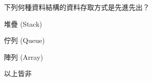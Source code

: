 \ifx\ntpcNinetyThree\undefined[93學年基北區] \fi
下列何種資料結構的資料存取方式是先進先出？
  \begin{optionlist}
  \item 堆疊 (Stack)
  \item 佇列 (Queue)\label{ntpc-93-a12}
  \item 陣列 (Array)
  \item 以上皆非
  \end{optionlist}
